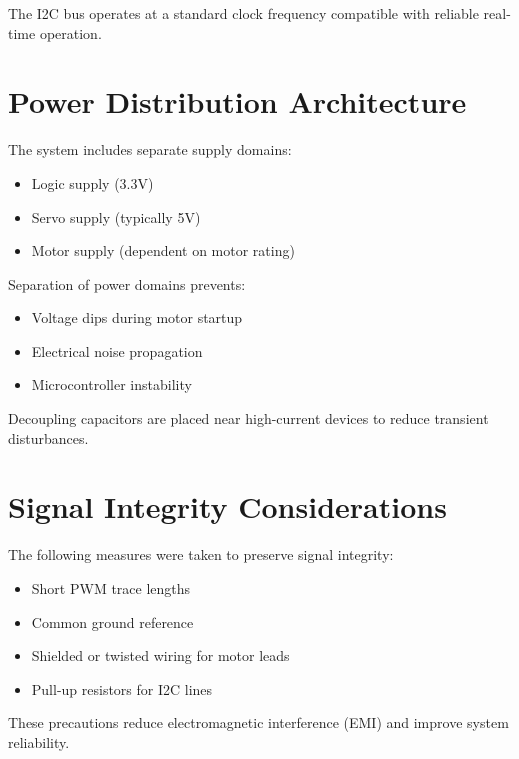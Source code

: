 The I2C bus operates at a standard clock frequency compatible with reliable real-time operation.


\section{Power Distribution Architecture}

The system includes separate supply domains:

\begin{itemize}
	\item Logic supply (3.3V)
	\item Servo supply (typically 5V)
	\item Motor supply (dependent on motor rating)
\end{itemize}

Separation of power domains prevents:

\begin{itemize}
	\item Voltage dips during motor startup
	\item Electrical noise propagation
	\item Microcontroller instability
\end{itemize}

Decoupling capacitors are placed near high-current devices to reduce transient disturbances.


\section{Signal Integrity Considerations}

The following measures were taken to preserve signal integrity:

\begin{itemize}
	\item Short PWM trace lengths
	\item Common ground reference
	\item Shielded or twisted wiring for motor leads
	\item Pull-up resistors for I2C lines
\end{itemize}

These precautions reduce electromagnetic interference (EMI) and improve system reliability.


